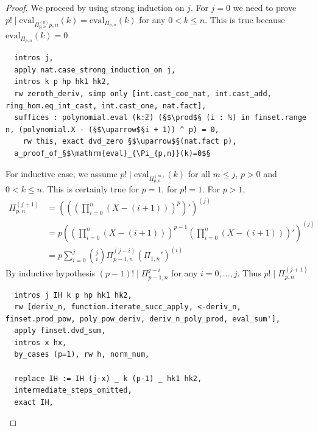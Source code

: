 \documentclass{report}
\theoremstyle{definition}
\begin{document}
\begin{proof}
We proceed by using strong induction on $j$. For $j=0$ we need to prove $p!\mid\mathrm{eval}_{\Pi_{p,n}^{(0)}{p,n}}(k)=\mathrm{eval}_{\Pi_{p,n}}(k)$ for any $0<k\le n$. This is true because $\mathrm{eval}_{\Pi_{p,n}}(k)=0$
\begin{verbatim}
  intros j,
  apply nat.case_strong_induction_on j,
  intros k p hp hk1 hk2,
  rw zeroth_deriv, simp only [int.cast_coe_nat, int.cast_add, ring_hom.eq_int_cast, int.cast_one, nat.fact],
  suffices : polynomial.eval (k:ℤ) (§$\prod$§ (i : ℕ) in finset.range n, (polynomial.X - (§$\uparrow$§i + 1)) ^ p) = 0,
    rw this, exact dvd_zero §$\uparrow$§(nat.fact p),
  a_proof_of_§$\mathrm{eval}_{\Pi_{p,n}}(k)=0$§
\end{verbatim}
For inductive case, we assume $p!\mid\mathrm{eval}_{\Pi_{p,n}^{(m)}}(k)$ for all $m\le j$, $p>0$ and $0<k\le n$. This is certainly true for $p=1$, for $p!=1$. For $p>1$,
\begin{equation*}
\begin{aligned}
\Pi_{p,n}^{(j+1)}&=\left(\left(\left(\prod_{i=0}^n(X-(i+1))\right)^p\right)'\right)^{(j)}\\
  &=p\left(\left(\prod_{i=0}^n(X-(i+1))\right)^{p-1}\left(\prod_{i=0}^n(X-(i+1))\right)'\right)^{(j)}\\
  &=p\sum_{i=0}^j{j\choose i}\Pi_{p-1,n}^{(j-i)}\left(\Pi_{1,n}'\right)^{(i)}
\end{aligned}
\end{equation*}
By inductive hypothesis $(p-1)!\mid\Pi_{p-1,n}^{j-i}$ for any $i=0,\dots,j$. Thus $p!\mid\Pi_{p,n}^{(j+1)}$
\begin{verbatim}
  intros j IH k p hp hk1 hk2,
  rw [deriv_n, function.iterate_succ_apply, <-deriv_n, finset.prod_pow, poly_pow_deriv, deriv_n_poly_prod, eval_sum'],
  apply finset.dvd_sum,
  intros x hx,
  by_cases (p=1), rw h, norm_num,

  replace IH := IH (j-x) _ k (p-1) _ hk1 hk2,
  intermediate_steps_omitted,
  exact IH,
\end{verbatim}
\end{proof}
\end{document}
